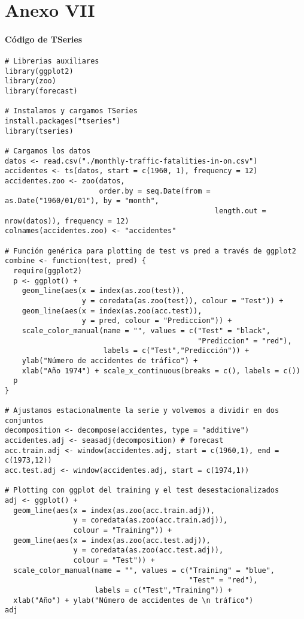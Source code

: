 \documentclass[12pt,a4paper,oneside]{article}
\begin{document}
\part*{Anexo VII}

\subsection*{Código de TSeries}

\begin{Verbatim}[fontsize=\footnotesize]
# Librerias auxiliares
library(ggplot2)
library(zoo)
library(forecast)

# Instalamos y cargamos TSeries
install.packages("tseries")
library(tseries)

# Cargamos los datos
datos <- read.csv("./monthly-traffic-fatalities-in-on.csv")
accidentes <- ts(datos, start = c(1960, 1), frequency = 12)
accidentes.zoo <- zoo(datos,
                      order.by = seq.Date(from = as.Date("1960/01/01"), by = "month",
                                                 length.out = nrow(datos)), frequency = 12)
colnames(accidentes.zoo) <- "accidentes"

# Función genérica para plotting de test vs pred a través de ggplot2
combine <- function(test, pred) {
  require(ggplot2)
  p <- ggplot() +
    geom_line(aes(x = index(as.zoo(test)),
                  y = coredata(as.zoo(test)), colour = "Test")) +
    geom_line(aes(x = index(as.zoo(acc.test)),
                  y = pred, colour = "Prediccion")) +
    scale_color_manual(name = "", values = c("Test" = "black",
                                             "Prediccion" = "red"),
                       labels = c("Test","Predicción")) +
    ylab("Número de accidentes de tráfico") +
    xlab("Año 1974") + scale_x_continuous(breaks = c(), labels = c())
  p
}

# Ajustamos estacionalmente la serie y volvemos a dividir en dos conjuntos
decomposition <- decompose(accidentes, type = "additive")
accidentes.adj <- seasadj(decomposition) # forecast
acc.train.adj <- window(accidentes.adj, start = c(1960,1), end = c(1973,12))
acc.test.adj <- window(accidentes.adj, start = c(1974,1))

# Plotting con ggplot del training y el test desestacionalizados
adj <- ggplot() +
  geom_line(aes(x = index(as.zoo(acc.train.adj)),
                y = coredata(as.zoo(acc.train.adj)),
                colour = "Training")) +
  geom_line(aes(x = index(as.zoo(acc.test.adj)),
                y = coredata(as.zoo(acc.test.adj)),
                colour = "Test")) +
  scale_color_manual(name = "", values = c("Training" = "blue",
                                           "Test" = "red"),
                     labels = c("Test","Training")) +
  xlab("Año") + ylab("Número de accidentes de \n tráfico")
adj


\end{Verbatim}
\end{document}

